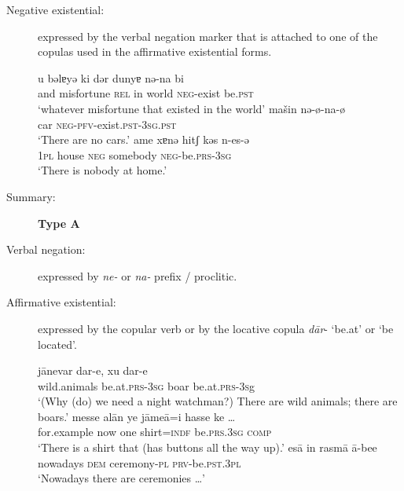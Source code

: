 \documentclass[output=paper,colorlinks,citecolor=brown]{langscibook}
\begin{document}
\begin{paperappendix}
\begin{unindented}
\begin{description}
\item[Negative existential:] expressed by the verbal negation marker that is attached to one of the copulas used in the affirmative existential forms.

\begin{exe}\ex \gll u bəlɐyə ki dər dunyɐ nə-na bi \\
and misfortune \textsc{rel}  in   world \textsc{neg}-exist   be.\textsc{pst} \\
    \glt `whatever misfortune that existed in the world'\parencite[263]{RastorguevaKerimova2012}
\ex \gll mašin nə-ø-na-ø \\
car \textsc{neg}-\textsc{pfv}-exist.\textsc{pst-3sg.pst} \\
    \glt `There are no cars.' \parencite[326, their glosses and zeroes]{RastorguevaKerimova2012}
\ex \gll ame xɐnə   hitʃ   kəs n-es-ə \\
\textsc{1pl} house \textsc{neg} somebody \textsc{neg}-be.\textsc{prs-3sg}\\
    \glt `There is nobody at home.' \parencite[133]{RastorguevaKerimova2012} 
\end{exe} 

\item[Summary:] \textbf{Type A}
\end{description}

 \citep{ShokriJahani2013}

\begin{description}
\item[Verbal negation:] expressed by \textit{ne-} or \textit{na-} prefix / proclitic.

\item[Affirmative existential:] expressed by the copular verb or by the locative copula \textit{dār}- `be.at' or `be located'.

\begin{exe}\ex \gll jānevar dar-e, xu    dar-e \\
wild.animals  be.at.\textsc{prs-3sg}   boar be.at.\textsc{prs-3s}g \\
    \glt `(Why (do) we need a night watchman?) There are wild animals; there are boars.' \parencite[84]{ShokriJahani2013}
\ex \gll messe alān  ye   jāmeā=i hasse ke … \\
for.example now  one shirt=\textsc{indf} be.\textsc{prs}.\textsc{3sg}    \textsc{comp} \\
    \glt `There is a shirt that (has buttons all the way up).'
\parencite[153]{ShokriJahani2013}
\ex \gll esā in rasmā ā-bee \\
nowadays \textsc{dem} ceremony-\textsc{pl} \textsc{prv}-be.\textsc{pst.3pl} \\
    \glt `Nowadays there are ceremonies …' \parencite[80]{ShokriJahani2013}
    \end{exe}


\end{description}
\end{unindented}
\end{paperappendix}
\end{document}
